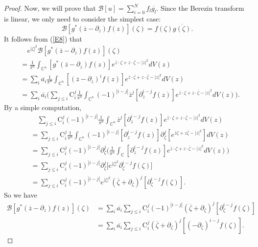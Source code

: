 \documentclass[11pt,reqno]{amsart}
\theoremstyle{definition}
\begin{document}
\begin{proof}
Now, we will prove that $\mathcal{B}[u]=\sum_{i=0}^N f_l\overline{g_l}$. Since the Berezin transform is linear, we only need to consider the simplest case:
$$\mathcal{B}[g^*(\overline{z}-\partial_z)f(z)](\zeta)=f(\zeta)\overline{g(\zeta)}.$$   It follows from (\ref{E8}) that
\begin{align*}
&\quad e^{|\zeta|^2}\mathcal{B}[g^*(\overline{z}-\partial_z)f(z)](\zeta)\\&=\frac{1}{\pi^n} \int_{\mathbb{C}^n}[g^*(\overline{z}-\partial_z)f(z)]e^{\overline{z}\cdot\zeta+z\cdot\overline{\zeta}-|z|^2}dV(z)\\
&=\sum_i \overline{a_i}\frac{1}{\pi^n} \int_{\mathbb{C}^n} [(\overline{z}-\partial_z)^if(z)]e^{\overline{z}\cdot\zeta+z\cdot\overline{\zeta}-|z|^2}dV(z)\\
&=\sum_i \overline{a_i}\bigg(\sum_{j\leq i}\mathrm{C}_{i}^j\frac{1}{\pi^n}\int_{\mathbb{C}^n}(-1)^{|i-j|}
\overline{z}^j[\partial_z^{i-j}f(z)]e^{\overline{z}\cdot\zeta+z\cdot\overline{\zeta}-|z|^2}dV(z)\bigg).
\end{align*}
By a simple computation,
\begin{align*}
&\quad\sum_{j\leq i}\mathrm{C}_{i}^j(-1)^{|i-j|}\frac{1}{\pi^n}\int_{\mathbb{C}^n}
\overline{z}^j[\partial_z^{i-j}f(z)]e^{\overline{z}\cdot\zeta+z\cdot\overline{\zeta}-|z|^2}dV(z)\\
&=\sum_{j\leq i}\mathrm{C}_{i}^j\frac{1}{\pi^n}\int_{\mathbb{C}^n}(-1)^{|i-j|}
[\partial_z^{i-j}f(z)]\partial_\zeta^j [e^{\overline{z}\zeta+z\overline{\zeta}-|z|^2}]dV(z)\\
&=\sum_{j\leq i}\mathrm{C}_{i}^j(-1)^{|i-j|}\partial_\zeta^j\bigg(\frac{1}{\pi^n}\int_{\mathbb{C}}
[\partial_z^{i-j}f(z)]e^{\overline{z}\cdot\zeta+z\cdot\overline{\zeta}-|z|^2}dV(z)\bigg)\\
&=\sum_{j\leq i}\mathrm{C}_{i}^j(-1)^{|i-j|}\partial_\zeta^j \bigg[e^{|\zeta|^2}\partial_\zeta^{i-j}f(\zeta)\bigg]\\
&=\sum_{j\leq i}\mathrm{C}_{i}^j(-1)^{|i-j|} e^{|\zeta|^2}(\overline{\zeta}+\partial_\zeta)^j[\partial_\zeta^{i-j}f(\zeta)].
\end{align*}
So we have
\begin{align}\label{E7}
\mathcal{B}[g^*(\overline{z}-\partial_z)f(z)](\zeta)&=\sum_i \overline{a_i} \sum_{j\leq i}\mathrm{C}_{i}^j(-1)^{|i-j|}(\overline{\zeta}+\partial_\zeta)^j[\partial_\zeta^{i-j}f(\zeta)]\nonumber\\
&=\sum_i \overline{a_i}  \sum_{j\leq i}\mathrm{C}_{i}^j(\overline{\zeta}+\partial_\zeta)^j[(-\partial_\zeta)^{i-j}f(\zeta)].
\end{align}

\end{proof}
\end{document}
